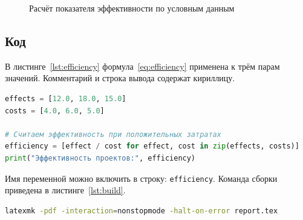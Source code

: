 \documentclass[a4paper, 12pt, numbers=enddot]{scrartcl}
\begin{document}
\begin{figure}[htbp]
  \centering
  \hfill
  \caption{Расчёт показателя эффективности по условным данным}
  \label{fig:calculation}
\end{figure}

\subsection{Код}
В листинге~\ref{lst:efficiency} формула~\eqref{eq:efficiency} применена к трём
парам значений. Комментарий и строка вывода содержат кириллицу.

\begin{lstlisting}[language=Python, caption={Расчёт на Python}, label={lst:efficiency}]
effects = [12.0, 18.0, 15.0]
costs = [4.0, 6.0, 5.0]

# Считаем эффективность при положительных затратах
efficiency = [effect / cost for effect, cost in zip(effects, costs)]
print("Эффективность проектов:", efficiency)
\end{lstlisting}

Имя переменной можно включить в строку: \lstinline[language=Python]|efficiency|.
Команда сборки приведена в листинге~\ref{lst:build}.

\begin{lstlisting}[language=bash, caption={Сборка документа}, label={lst:build}]
latexmk -pdf -interaction=nonstopmode -halt-on-error report.tex
\end{lstlisting}
\end{document}
